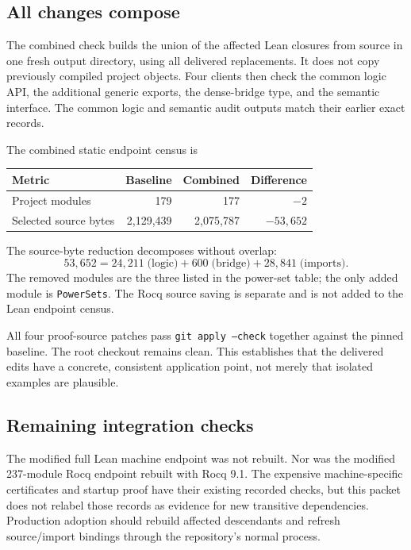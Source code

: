 \documentclass[11pt]{article}
\begin{document}
\subsection{All changes compose}

The combined check builds the union of the affected Lean closures from source in one fresh output directory, using all delivered replacements. It does not copy previously compiled project objects. Four clients then check the common logic API, the additional generic exports, the dense-bridge type, and the semantic interface. The common logic and semantic audit outputs match their earlier exact records.

The combined static endpoint census is
\begin{center}
\begin{tabular}{lrrr}
\toprule
Metric & Baseline & Combined & Difference\\
\midrule
Project modules & 179 & 177 & $-2$\\
Selected source bytes & 2,129,439 & 2,075,787 & $-53,652$\\
\bottomrule
\end{tabular}
\end{center}
The source-byte reduction decomposes without overlap:
\[
  53,652=24,211\;\text{(logic)}+600\;\text{(bridge)}+28,841\;\text{(imports)}.
\]
The removed modules are the three listed in the power-set table; the only added module is \texttt{PowerSets}. The Rocq source saving is separate and is not added to the Lean endpoint census.

All four proof-source patches pass \texttt{git apply --check} together against the pinned baseline. The root checkout remains clean. This establishes that the delivered edits have a concrete, consistent application point, not merely that isolated examples are plausible.

\subsection{Remaining integration checks}

The modified full Lean machine endpoint was not rebuilt. Nor was the modified 237-module Rocq endpoint rebuilt with Rocq 9.1. The expensive machine-specific certificates and startup proof have their existing recorded checks, but this packet does not relabel those records as evidence for new transitive dependencies. Production adoption should rebuild affected descendants and refresh source/import bindings through the repository's normal process.
\end{document}
